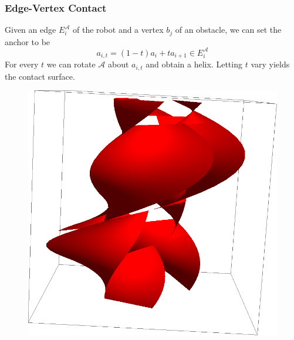 \documentclass[ucs,9pt,pagenumbersfull]{beamer}
\begin{document}
\begin{frame}
  \frametitle{Edge-Vertex Contact}
  Given an edge \(E^{\mathcal{A}}_i\) of the robot and a vertex
  \(b_j\) of an obstacle, we can set the anchor to be
  \[
  a_{i,t} = (1-t) a_i + t a_{i+1} \in E^{\mathcal{A}}_i
  \]
  For every \(t\) we can rotate \(\mathcal{A}\) about \(a_{i,t}\) and
  obtain a helix. Letting \(t\) vary yields the contact surface.

  \begin{figure}
    \centering
    \includegraphics[scale=0.2]{Figures/evcc}
  \end{figure}
\end{frame}
\end{document}
